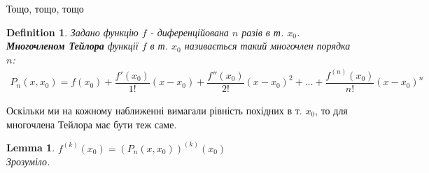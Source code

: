 \documentclass[a4paper, 14pt]{article}
\theoremstyle{theoremdd}
\theoremstyle{theoremdd}
\newtheorem{definition}[theorem]{Definition}
\theoremstyle{theoremdd}
\theoremstyle{theoremdd}
\theoremstyle{theoremdd}
\theoremstyle{theoremdd}
\theoremstyle{theoremdd}
\newtheorem{lemma}[theorem]{Lemma}
\theoremstyle{theoremdd}
\begin{document}
Тощо, тощо, тощо
\begin{definition}
Задано функцію $f$ - диференційована $n$ разів в т. $x_0$.\\
\textbf{Многочленом Тейлора} функції $f$ в т. $x_0$ називається такий многочлен порядка $n$:
\begin{align*}
P_n(x,x_0) = f(x_0) + \dfrac{f'(x_0)}{1!}(x-x_0) + \dfrac{f''(x_0)}{2!}(x-x_0)^2 + \dots + \dfrac{f^{(n)}(x_0)}{n!}(x-x_0)^n
\end{align*}
\end{definition}
Оскільки ми на кожному наближенні вимагали рівність похідних в т. $x_0$, то для многочлена Тейлора має бути теж саме.
\begin{lemma}
$f^{(k)}(x_0) = (P_n(x,x_0))^{(k)}(x_0)$\\
\textit{Зрозуміло.}
\end{lemma}
\end{document}
